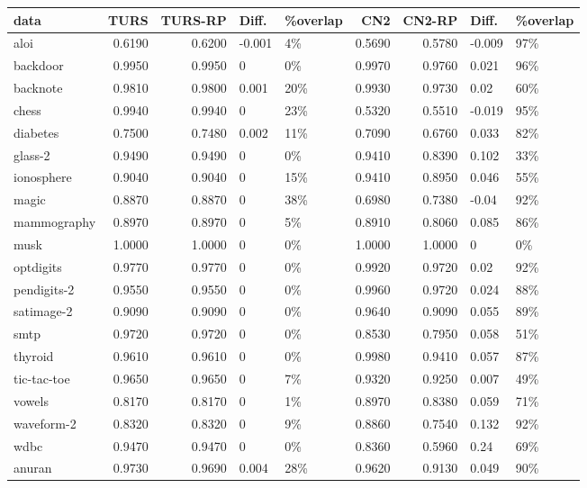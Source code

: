 \begin{table}[ht]
\centering
\small
\begin{tabular}{l|rrll|rrll}
  \hline
data & TURS & TURS-RP & Diff. & \%overlap & CN2 & CN2-RP & Diff. & \%overlap \\ 
  \hline
aloi & 0.6190 & 0.6200 & -0.001 & 4\% & 0.5690 & 0.5780 & -0.009 & 97\% \\ 
  backdoor & 0.9950 & 0.9950 & 0 & 0\% & 0.9970 & 0.9760 & 0.021 & 96\% \\ 
  backnote & 0.9810 & 0.9800 & 0.001 & 20\% & 0.9930 & 0.9730 & 0.02 & 60\% \\ 
  chess & 0.9940 & 0.9940 & 0 & 23\% & 0.5320 & 0.5510 & -0.019 & 95\% \\ 
  diabetes & 0.7500 & 0.7480 & 0.002 & 11\% & 0.7090 & 0.6760 & 0.033 & 82\% \\ 
  glass-2 & 0.9490 & 0.9490 & 0 & 0\% & 0.9410 & 0.8390 & 0.102 & 33\% \\ 
  ionosphere & 0.9040 & 0.9040 & 0 & 15\% & 0.9410 & 0.8950 & 0.046 & 55\% \\ 
  magic & 0.8870 & 0.8870 & 0 & 38\% & 0.6980 & 0.7380 & -0.04 & 92\% \\ 
  mammography & 0.8970 & 0.8970 & 0 & 5\% & 0.8910 & 0.8060 & 0.085 & 86\% \\ 
  musk & 1.0000 & 1.0000 & 0 & 0\% & 1.0000 & 1.0000 & 0 & 0\% \\ 
  optdigits & 0.9770 & 0.9770 & 0 & 0\% & 0.9920 & 0.9720 & 0.02 & 92\% \\ 
  pendigits-2 & 0.9550 & 0.9550 & 0 & 0\% & 0.9960 & 0.9720 & 0.024 & 88\% \\ 
  satimage-2 & 0.9090 & 0.9090 & 0 & 0\% & 0.9640 & 0.9090 & 0.055 & 89\% \\ 
  smtp & 0.9720 & 0.9720 & 0 & 0\% & 0.8530 & 0.7950 & 0.058 & 51\% \\ 
  thyroid & 0.9610 & 0.9610 & 0 & 0\% & 0.9980 & 0.9410 & 0.057 & 87\% \\ 
  tic-tac-toe & 0.9650 & 0.9650 & 0 & 7\% & 0.9320 & 0.9250 & 0.007 & 49\% \\ 
  vowels & 0.8170 & 0.8170 & 0 & 1\% & 0.8970 & 0.8380 & 0.059 & 71\% \\ 
  waveform-2 & 0.8320 & 0.8320 & 0 & 9\% & 0.8860 & 0.7540 & 0.132 & 92\% \\ 
  wdbc & 0.9470 & 0.9470 & 0 & 0\% & 0.8360 & 0.5960 & 0.24 & 69\% \\ 
  \hline
  anuran & 0.9730 & 0.9690 & 0.004 & 28\% & 0.9620 & 0.9130 & 0.049 & 90\% \\ 

\end{tabular}
\end{table}
